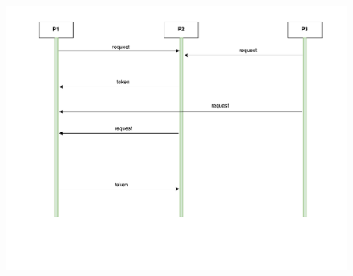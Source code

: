 \documentclass{scrartcl}
\begin{document}
				\begin{figure}[h]
					\includegraphics[scale=0.7]{aufgabe3a.pdf}
				\end{figure}
	
\end{document}
